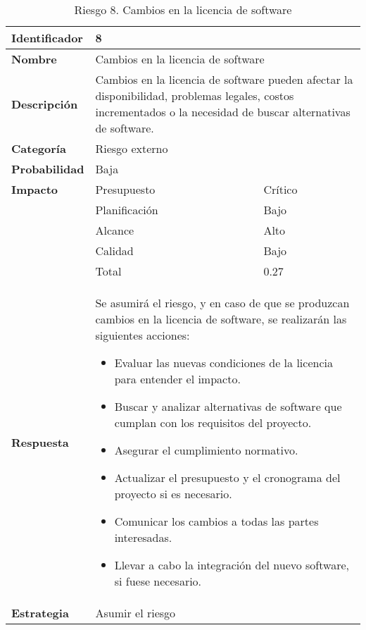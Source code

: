 \begin{table}[H]
    \centering
    \caption{Riesgo 8. Cambios en la licencia de software}
    \label{table:risk_licencia}
    \begin{tabular}{>{\columncolor{lightgreen!20}}l l l}
    \toprule
    \rowcolor{lightgreen}
    \textbf{Identificador} & \multicolumn{2}{l}{8} \\
    \midrule
    \textbf{Nombre} & \multicolumn{2}{l}{Cambios en la licencia de software} \\
    \midrule
    \textbf{Descripción} & \multicolumn{2}{p{10cm}}{Cambios en la licencia de software pueden afectar la disponibilidad, problemas legales, costos incrementados o la necesidad de buscar alternativas de software.} \\
    \midrule
    \textbf{Categoría} & \multicolumn{2}{l}{Riesgo externo} \\
    \midrule
    \textbf{Probabilidad} & \multicolumn{2}{l}{Baja} \\
    \midrule
    \textbf{Impacto} & Presupuesto & Crítico \\
    \cmidrule(lr){2-3}
    & Planificación & Bajo \\
    \cmidrule(lr){2-3}
    & Alcance & Alto \\
    \cmidrule(lr){2-3}
    & Calidad & Bajo \\
    \cmidrule(lr){2-3}
    & Total & 0.27 \\
    \midrule
    \textbf{Respuesta} & \multicolumn{2}{p{10cm}}{Se asumirá el riesgo, y en caso de que se produzcan cambios en la licencia de software, se realizarán las siguientes acciones:
    \begin{itemize}
    \item Evaluar las nuevas condiciones de la licencia para entender el impacto.
    \item Buscar y analizar alternativas de software que cumplan con los requisitos del proyecto.
    \item Asegurar el cumplimiento normativo.
    \item Actualizar el presupuesto y el cronograma del proyecto si es necesario.
    \item Comunicar los cambios a todas las partes interesadas.
    \item Llevar a cabo la integración  del nuevo software, si fuese necesario.
    \end{itemize} } \\
    \midrule
    \textbf{Estrategia} & \multicolumn{2}{l}{Asumir el riesgo} \\
    \bottomrule
    \end{tabular}
\end{table}


